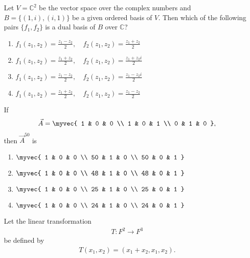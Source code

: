 \item
Let $V = \mathbb{C}^2$ be the vector space over the complex numbers and $B = \{(1, i), (i, 1)\}$ be a given ordered basis of $V$. Then which of the following pairs $\{f_1, f_2\}$ is a dual basis of $B$ over $\mathbb{C}$?
\hfill{}
\begin{multicols}{2}
\begin{enumerate}
  \item $f_1(z_1, z_2) = \frac{z_1 - z_2}{2}, \quad f_2(z_1, z_2) = \frac{z_1 + z_2}{2}$
  \item $f_1(z_1, z_2) = \frac{z_1 + z_2}{2}, \quad f_2(z_1, z_2) = \frac{z_1 + z_2 i}{2}$
  \item $f_1(z_1, z_2) = \frac{z_1 - z_2}{2}, \quad f_2(z_1, z_2) = \frac{z_1 - z_2 i}{2}$
  \item $f_1(z_1, z_2) = \frac{z_1 + z_2}{2}, \quad f_2(z_1, z_2) = \frac{z_1 - z_2}{2}$
\end{enumerate}
\end{multicols}
\item
If 
\begin{align*}
\vec{A} = \myvec{
1 & 0 & 0 \\
1 & 0 & 1 \\
0 & 1 & 0
},
\end{align*}
then $\vec{A}^{50}$ is
\hfill{}
\begin{multicols}{4}
\begin{enumerate}
  \item $\myvec{
1 & 0 & 0 \\
50 & 1 & 0 \\
50 & 0 & 1
}$
  \item $\myvec{
1 & 0 & 0 \\
48 & 1 & 0 \\
48 & 0 & 1
}$
  \item $\myvec{
1 & 0 & 0 \\
25 & 1 & 0 \\
25 & 0 & 1
}$
  \item $\myvec{
1 & 0 & 0 \\
24 & 1 & 0 \\
24 & 0 & 1
}$
\end{enumerate}
\end{multicols}
\item
Let the linear transformation 
\begin{align*}
T : F^2 \to F^3
\end{align*}
be defined by
\begin{align*}
T(x_1, x_2) = (x_1 + x_2, x_1, x_2).
\end{align*}
